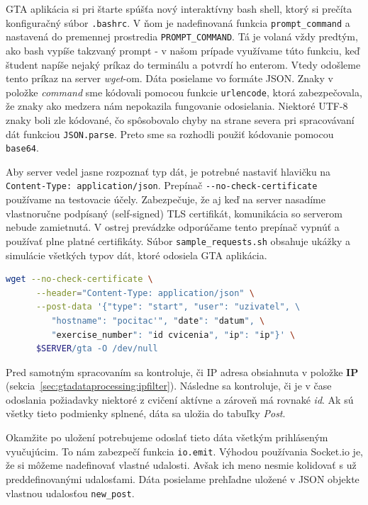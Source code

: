GTA aplikácia si pri štarte spúšťa nový interaktívny bash shell, ktorý si prečíta
konfiguračný súbor \verb'.bashrc'. V ňom je nadefinovaná funkcia \verb'prompt_command'
a nastavená do premennej prostredia \verb'PROMPT_COMMAND'. Tá je volaná vždy predtým,
ako bash vypíše takzvaný prompt - v našom prípade využívame túto funkciu, keď študent
napíše nejaký príkaz do terminálu a potvrdí ho enterom. Vtedy odošleme tento príkaz na
server \textit{wget}-om.
Dáta posielame vo formáte JSON. Znaky v položke \textit{command} sme kódovali
pomocou funkcie \verb'urlencode', ktorá zabezpečovala, že znaky ako medzera nám
nepokazila fungovanie odosielania. Niektoré UTF-8 znaky boli zle kódované, čo
spôsobovalo chyby na strane severa pri spracovávaní dát funkciou \verb'JSON.parse'.
Preto sme sa rozhodli použiť kódovanie pomocou \verb'base64'.

Aby server vedel jasne rozpoznať typ dát,
je potrebné nastaviť hlavičku na \\ \texttt{Content-Type: application/json}.
Prepínač \verb'--no-check-certificate' používame na testovacie účely.
Zabezpečuje, že aj keď na server nasadíme vlastnoručne podpísaný (self-signed)
TLS certifikát, komunikácia so serverom nebude zamietnutá. V ostrej prevádzke
odporúčame tento prepínač vypnúť a používať plne platné certifikáty.
Súbor \texttt{sample\_requests.sh} obsahuje ukážky a simulácie všetkých typov dát,
ktoré odosiela GTA aplikácia.

\begin{lstlisting}[language=Bash]
 wget --no-check-certificate \
      --header="Content-Type: application/json" \
      --post-data '{"type": "start", "user": "uzivatel", \
         "hostname": "pocitac'", "date": "datum", \
         "exercise_number": "id cvicenia", "ip": "ip"}' \
      $SERVER/gta -O /dev/null
\end{lstlisting}

Pred samotným spracovaním sa kontroluje, či IP adresa
obsiahnuta v položke \textbf{IP} (sekcia~\ref{sec:gtadataprocessing:ipfilter}).
Následne sa kontroluje, či je v čase odoslania požiadavky niektoré z cvičení aktívne
a zároveň má rovnaké \textit{id}. Ak sú všetky tieto podmienky splnené,
dáta sa uložia do tabuľky \textit{Post}.

Okamžite po uložení potrebujeme odoslať tieto dáta všetkým prihláseným vyučujúcim.
To nám zabezpečí funkcia \verb'io.emit'. Výhodou používania Socket.io je, že si môžeme
nadefinovať vlastné udalosti. Avšak ich meno nesmie kolidovať s už preddefinovanými
udalosťami. Dáta posielame prehľadne uložené v JSON objekte vlastnou udalosťou
\verb'new_post'.

